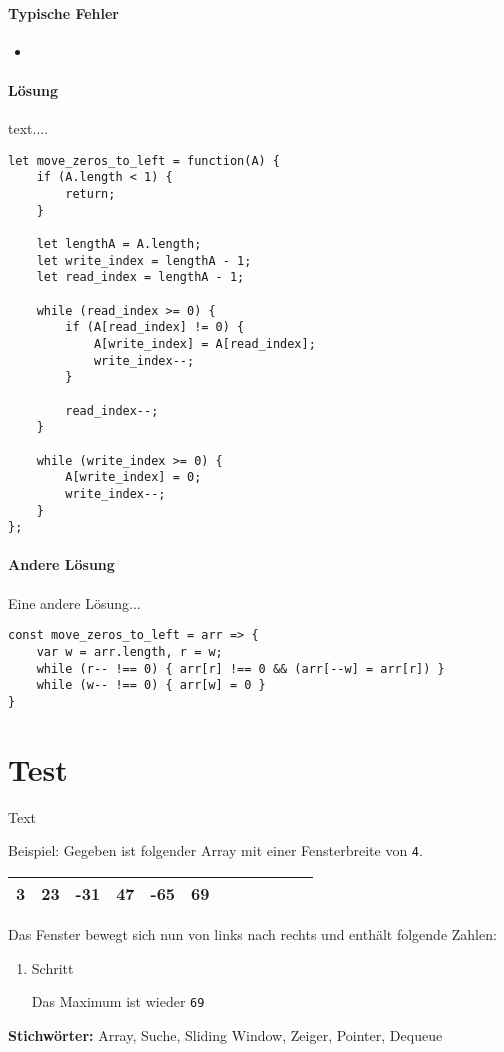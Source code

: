 \documentclass{book}
\begin{document}
\paragraph{Typische Fehler}
\begin{itemize} 
	\item 	
\end{itemize}

\paragraph{Lösung}
text....

\begin{lstlisting}[caption=My Javascript Example]
let move_zeros_to_left = function(A) {
	if (A.length < 1) {
		return;
	}

	let lengthA = A.length;
	let write_index = lengthA - 1;
	let read_index = lengthA - 1;

	while (read_index >= 0) {
		if (A[read_index] != 0) {
			A[write_index] = A[read_index];
			write_index--;
		}
	
		read_index--;
	}

	while (write_index >= 0) {
		A[write_index] = 0;
		write_index--;
	}
};
\end{lstlisting}


\paragraph{Andere Lösung}
Eine andere Lösung...

\begin{lstlisting}[caption=My Javascript Example]
const move_zeros_to_left = arr => {
	var w = arr.length, r = w;
	while (r-- !== 0) { arr[r] !== 0 && (arr[--w] = arr[r]) }
	while (w-- !== 0) { arr[w] = 0 }
}
\end{lstlisting}

\section{Test}
\begin{examplei}
	Text
	
	Beispiel:
	Gegeben ist folgender Array mit einer Fensterbreite von \lstinline|4|. 	
	
	\begin{tabular}{|l|l|l|l|l|l|l|l|l|l|l|l|} 
		\hline
		3 & 23 & -31 & 47 & -65 & 69 \\
		\hline
	\end{tabular}
	Das Fenster bewegt sich nun von links nach rechts und enthält folgende Zahlen:
	\begin{enumerate}
		\item Schritt	

		Das Maximum ist wieder \lstinline|69|
	\end{enumerate}
		
\end{examplei}
{\bf Stichwörter:} Array, Suche, Sliding Window, Zeiger, Pointer, Dequeue
\end{document}

